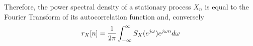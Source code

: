 %
%
%
%
%

Therefore, the power spectral density of a stationary process $X_n$ is equal to the Fourier Transform of its autocorrelation function and, conversely
\begin{equation}\label{ec:dep2}
r_X[n] = \frac{1}{2\pi} \int_{-\infty}^\infty S_X(e^{j \omega}) e^{j \omega n} d\omega
\end{equation}


